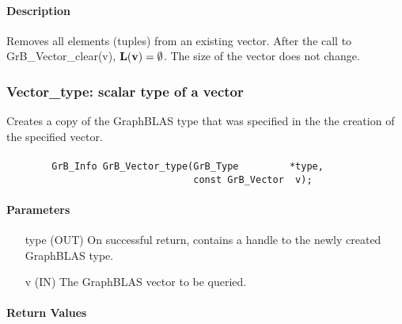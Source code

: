 \paragraph{Description}

Removes all elements (tuples) from an existing vector. After the call to
{\sf GrB\_Vector\_clear(v)}, 
$\mathbf{L}({\bf v}) = \emptyset$. The size of the vector does not change. 


\subsubsection{{\sf Vector\_type}: scalar type of a vector}

Creates a copy of the GraphBLAS type that was specified in the the creation of
the specified vector.

\paragraph{\syntax}

\begin{verbatim}
        GrB_Info GrB_Vector_type(GrB_Type         *type,
                                 const GrB_Vector  v);
\end{verbatim}

\paragraph{Parameters}

\begin{itemize}[leftmargin=1.1in]
    \item[{\sf type}] ({\sf OUT}) On successful return, contains a handle
                                  to the newly created GraphBLAS type.
    \item[{\sf v}]    ({\sf IN})  The GraphBLAS vector to be queried.
\end{itemize}

\paragraph{Return Values}

